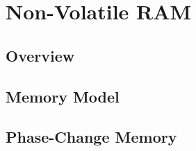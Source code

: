 \chapter{Non-Volatile RAM}
\label{ch:nvram}

\section{Overview}
\section{Memory Model}
\section{Phase-Change Memory}
